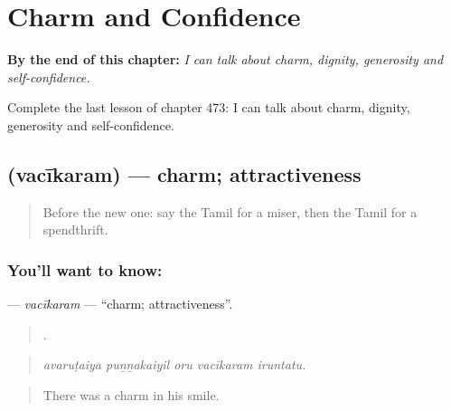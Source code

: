 
\chapter{Charm and Confidence}
\label{ch:ta-charm-and-confidence}

\begin{chapteropening}
\textbf{By the end of this chapter:} \emph{I can talk about charm, dignity, generosity and self-confidence.}

Complete the last lesson of chapter 473: I can talk about charm, dignity, generosity and self-confidence.
\end{chapteropening}

\section[\texorpdfstring{\ta{வசீகரம்} (vacīkaram)}{வசீகரம் (vacīkaram)}]{ (vacīkaram) — charm; attractiveness}

\label{lesson:TA-C473-vacikaram}



\begin{quote}
Before the new one: say the Tamil for a miser, then the Tamil for a spendthrift.
\end{quote}

\subsection*{You'll want to know: }
\textbf{} — \emph{vacīkaram} — \textquotedblleft{}charm; attractiveness\textquotedblright{}.

\begin{quote}
    .
\end{quote}

\begin{quote}
\emph{avaruṭaiya puṉṉakaiyil oru vacīkaram iruntatu.}
\end{quote}

\begin{quote}
There was a charm in his smile.
\end{quote}

